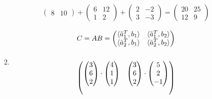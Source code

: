 \documentclass[12pt]{article}
\begin{document}
\begin{enumerate}
\begin{enumerate}
\begin{align*}
\begin{pmatrix}
                8 & 10
            \end{pmatrix}
            + \begin{pmatrix}
                6 & 12 \\
                1 & 2
            \end{pmatrix}
            + \begin{pmatrix}
                2 & -2 \\
                3 & -3
            \end{pmatrix}
            = \begin{pmatrix}
                20 & 25 \\
                12 & 9
            \end{pmatrix}
        \end{align*}
        \item 
        \begin{align*}
            C = AB = 
            \begin{pmatrix}
                \langle \Tilde{a}_1^T, b_1 \rangle & \langle \Tilde{a}_1^T, b_2 \rangle \\
                \langle \Tilde{a}_2^T, b_1 \rangle & \langle \Tilde{a}_2^T, b_2 \rangle
            \end{pmatrix} \\ \\
            \begin{pmatrix}
                \begin{pmatrix}
                    3 \\
                    6 \\
                    2
                \end{pmatrix} \cdot
                \begin{pmatrix}
                    4 \\
                    1 \\
                    1
                \end{pmatrix} &
                \begin{pmatrix}
                    3 \\
                    6 \\
                    2
                \end{pmatrix} \cdot
                \begin{pmatrix}
                    5 \\
                    2 \\
                    -1
                \end{pmatrix} \\ \\

\end{pmatrix}
\end{align*}
\end{enumerate}
\end{enumerate}
\end{document}
